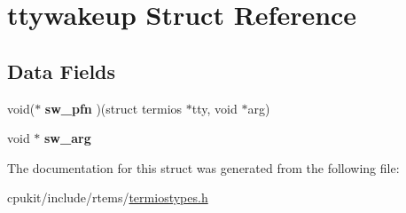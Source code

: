 \hypertarget{structttywakeup}{}\section{ttywakeup Struct Reference}
\label{structttywakeup}
\subsection*{Data Fields}
\begin{DoxyCompactItemize}
\item 
\mbox{\label{structttywakeup_a86a9ed49d343be2260e9e636faa12c86}} 
void($\ast$ {\bfseries sw\+\_\+pfn} )(struct termios $\ast$tty, void $\ast$arg)
\item 
\mbox{\label{structttywakeup_a0e012c7d92a5cff2450d82ad511a9cca}} 
void $\ast$ {\bfseries sw\+\_\+arg}
\end{DoxyCompactItemize}


The documentation for this struct was generated from the following file\+:\begin{DoxyCompactItemize}
\item 
cpukit/include/rtems/\mbox{\hyperlink{termiostypes_8h}{termiostypes.\+h}}\end{DoxyCompactItemize}
